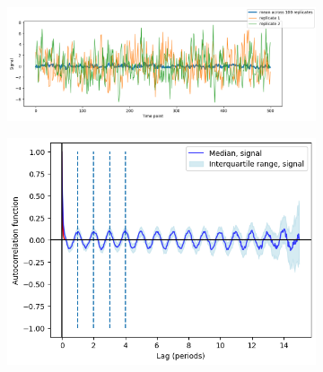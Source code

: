 \begin{figure}
  \centering
  \begin{subfigure}[t]{0.6\textwidth}
  \centering
    \includegraphics[width=\linewidth]{gillespie_k5_d0p5_mean.png}
    \caption{
    }
    \label{fig:acf-noisetimescale-highd0-ts}
  \end{subfigure}%
  \begin{subfigure}[t]{0.4\textwidth}
  \centering
    \includegraphics[width=\linewidth]{gillespie_k5_d0p5_acf.png}
    \caption{
    }
    \label{fig:acf-noisetimescale-highd0-acf}
  \end{subfigure}


\end{figure}
